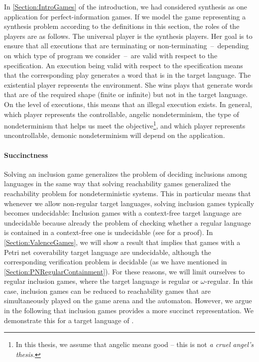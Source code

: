 \documentclass[../../diss.tex]{subfiles}
\begin{document}
In \cref{Section:IntroGames} of the introduction, we had considered synthesis as one application for perfect-information games.
If we model the game representing a synthesis problem according to the definitions in this section, the roles of the players are as follows.
The universal player is the synthesis players.
Her goal is to ensure that all executions that are terminating or \mbox{non-terminating~--~depending} on which type of program we consider~--~are valid with respect to the specification.
An execution being valid with respect to the specification means that the corresponding play generates a word that is in the target language.
The existential player represents the environment.
She wins  plays that generate words that are of the required shape (\ie finite or infinite) but not in the target language.
On the level of executions, this means that an illegal execution exists.
In general, which player represents the controllable, angelic nondeterminism, \ie the type of nondeterminism that helps us meet the objective\footnote{In this thesis, we assume that angelic means good -- this is not \emph{a cruel angel's thesis.}}, and which player represents uncontrollable, demonic nondeterminism will depend on the application.

\paragraph{Succinctness}

Solving an inclusion game generalizes the problem of deciding inclusions among languages in the same way that solving reachability games generalized the reachability problem for nondeterministic systems.
This in particular means that whenever we allow non-regular target languages, solving inclusion games typically becomes undecidable:
Inclusion games with a context-free target language are undecidable because already the problem of checking whether a regular language  is contained in a context-free one is undecidable (see \eg \cite{HopcroftU79} for a proof).
In \cref{Section:ValenceGames}, we will show a result that implies that games with a Petri net coverability target language are undecidable, although the corresponding verification problem is decidable (as we have mentioned in \cref{Section:PNRegularContainment}).
For these reasons, we will limit ourselves to regular inclusion games, where the target language is regular or $\omega$-regular.
In this case, inclusion games can be reduced to reachability games that are simultaneously played on the game arena and the automaton.
However, we argue in the following that inclusion games provides a more succinct representation.
We demonstrate this for a target language of .
\end{document}
